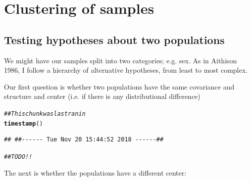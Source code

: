 \documentclass{article}\usepackage[]{graphicx}\usepackage[]{color}
\makeatletter
\newcommand{\hlcom}[1]{\textcolor[rgb]{0.678,0.584,0.686}{\textit{#1}}}%
\newcommand{\hlstd}[1]{\textcolor[rgb]{0.345,0.345,0.345}{#1}}%
\newcommand{\hlkwd}[1]{\textcolor[rgb]{0.737,0.353,0.396}{\textbf{#1}}}%
\newenvironment{kframe}{%
 \def\at@end@of@kframe{}%
 \ifinner\ifhmode%
  \def\at@end@of@kframe{\end{minipage}}%
  \begin{minipage}{\columnwidth}%
 \fi\fi%
 \def\FrameCommand##1{\hskip\@totalleftmargin \hskip-\fboxsep
 \colorbox{shadecolor}{##1}\hskip-\fboxsep
     \hskip-\linewidth \hskip-\@totalleftmargin \hskip\columnwidth}%
 \MakeFramed {\advance\hsize-\width
   \@totalleftmargin\z@ \linewidth\hsize
   \@setminipage}}%
 {\par\unskip\endMakeFramed%
 \at@end@of@kframe}
\newenvironment{knitrout}{}{} %
\makeatother
\begin{document}
\section{Clustering of samples}



\clearpage

\subsection{Testing hypotheses about two populations}
We might have our samples split into two categories; e.g. sex. As in Aithison 1986\cite{}, I follow a hierarchy of alternative hypotheses, from least to most complex.

Our first question is whether two populations have the same covariance and structure and center (i.e. if there is any distributional difference)

\begin{knitrout}
\color{fgcolor}\begin{kframe}
\begin{alltt}
\hlcom{## This chunk was last ran in}
\hlkwd{timestamp}\hlstd{()}
\end{alltt}
\begin{verbatim}
## ##------ Tue Nov 20 15:44:52 2018 ------##
\end{verbatim}
\begin{alltt}
\hlcom{##TODO!!}
\end{alltt}
\end{kframe}
\end{knitrout}

The next is whether the populations have a different center:
\end{document}
